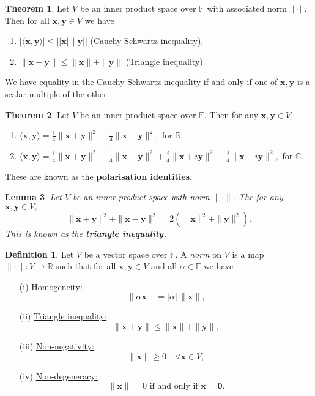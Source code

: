 \documentclass[12pt, a4paper]{article}
\newcommand{\bb}[1]{\mathbb{#1}}
\newcommand{\f}[2]{\frac{#1}{#2}}
\newcommand{\mb}[1]{\mathbf{#1}}
\theoremstyle{definition}
\newtheorem{definition}{Definition}[section]
\newtheorem{theorem}{Theorem}[section]
\theoremstyle{plain}
\newtheorem{lemma}[theorem]{Lemma}
\begin{document}
\begin{theorem}
Let $V$ be an inner product space over $\bb{F}$ with associated norm $||\cdot||.$ Then for all $\mathbf{x,y} \in V$ we have \begin{enumerate}
    
    \item $|\langle \mathbf{x,y} \rangle|\leq ||\mathbf{x}||\, ||\mathbf{y}||$ (Cauchy-Schwartz inequality),

    \item $\|\mathbf{x+y}\|\leq \|\mathbf{x}\|+\|\mathbf{y}\|$ (Triangle inequality)

\end{enumerate} 
We have equality in the Cauchy-Schwartz inequality if and only if one of $\mathbf{x,y}$ is a scalar multiple of the other.
\end{theorem}

\begin{theorem}
Let $V$ be an inner product space over $\bb{F}.$ Then for any $\mathbf{x,y}\in V$, 
\begin{enumerate}
    
    \item $\langle \mb{x,y} \rangle=\f{1}{4}\|\mb{x+y}\|^2-\f{1}{4}\|\mb{x-y}\|^2,$ for $\bb{R}.$

    \item $\langle \mb{x,y} \rangle =\f{1}{4}\|\mb{x+y}\|^2-\f{1}{4}\|\mb{x-y}\|^2+\f{i}{4}\|\mb{x}+i\mb{y}\|^2-\f{i}{4}\|\mb{x}-i\mb{y}\|^2,$ for $\bb{C}.$

\end{enumerate}
These are known as the \textbf{polarisation identities.}
\end{theorem}

\begin{lemma}
Let $V$ be an inner product space with norm $\|\cdot\|.$ The for any $\mb{x,y}\in V,$ $$\|\mb{x+y}\|^2+\|\mb{x-y}\|^2=2(\|\mb{x}\|^2+\|\mb{y}\|^2).$$ This is known as the \textbf{triangle inequality.}
\end{lemma}

\begin{definition}
Let $V$ be a vector space over $\bb{F}.$ A \textit{norm} on $V$ is a map $\|\cdot\|:V\to \bb{R}$ such that for all $\mb{x,y}\in V$ and all $\alpha\in \bb{F}$ we have \begin{enumerate}
    
    \item[(i)] \underline{Homogeneity:} $$\|\alpha\mb{x}\|=|\alpha|\,\|\mathbf{x}\|,$$

    \item[(ii)] \underline{Triangle inequality:} $$\|\mb{x+y}\|\leq \|\mb{x}\|+\|\mb{y}\|,$$

    \item[(iii)] \underline{Non-negativity:} $$\|\mb{x}\|\geq 0 \quad \forall\mb{x}\in V,$$

    \item[(iv)] \underline{Non-degeneracy:} $$\|\mb{x}\|=0 \text{ if and only if } \mb{x=0}.$$

\end{enumerate}
\end{definition}
\end{document}
